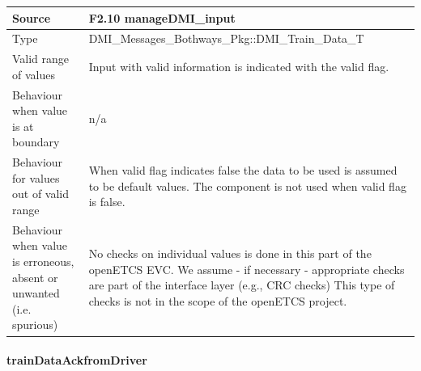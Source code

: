 \begin{longtable}{p{}p{}}
\midrule
Source				& F2.10 manageDMI\_input\\ 
\midrule
Type					& DMI\_Messages\_Bothways\_Pkg::DMI\_Train\_Data\_T \\
\midrule
Valid range of values	& Input with valid information is indicated with the valid flag. \\
\midrule
Behaviour when value is at boundary	& n/a\\
\midrule
Behaviour for values out of valid range	& When valid flag indicates false the data to be used is assumed to be default values. The component is not used when valid flag is false.\\
\midrule
Behaviour when value is erroneous, absent or unwanted (i.e. spurious) & No checks on individual values is done in this part of the openETCS EVC. We assume - if necessary - appropriate checks are part of the interface layer (e.g., CRC checks) This type of checks is not in the scope of the openETCS project.\\
\bottomrule

\end{longtable}

\paragraph{trainDataAckfromDriver}

